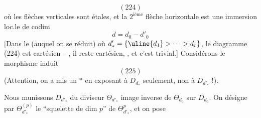 \[
(224)
\]
où les flèches verticales sont étales,
et la $2^{\mathrm{ième}}$ flèche horizontale est une
immersion loc.le de codim 
\[
\tag{225}d=d_0-d'_0
\]
[Dans le  (auquel on se réduit)
où $d'_* = \{\uline{d_1}>\cdots>d_r\}$, le diagramme
(224) est cartésien -- , il
reste  cartésien, , et c'est trivial.]
Considérons le morphisme induit
\[
(225)
\]
(Attention, on a mis un $*$ en exposant
à $D_{d_*}$ seulement, non à $D_{d'_*}$ !).

Nous munissons $D_{d'_*}$ du diviseur
$\Theta_{d'_*}$ image inverse de $\Theta_{d_0}$ sur $D_{d_0}$.
On désigne par $\Theta_{d'_*}^{(p)}$ le ``squelette
de dim $p$'' de $\Theta_{d'_*}^{p}$, et  on pose
